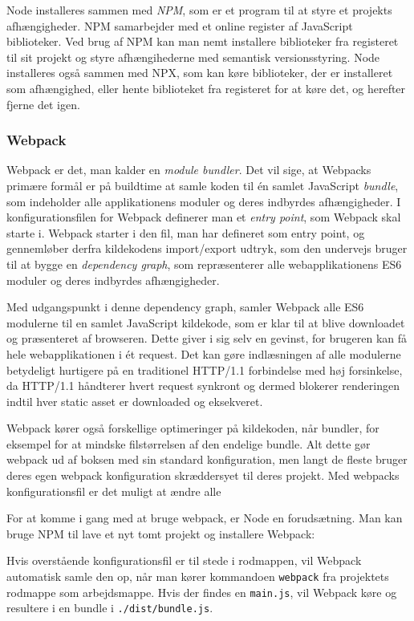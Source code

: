 \documentclass[]{article}
\begin{document}
Node installeres sammen med \emph{NPM}, som er et program til at styre
et projekts afhængigheder. NPM samarbejder med et online register af
JavaScript biblioteker. Ved brug af NPM kan man nemt installere
biblioteker fra registeret til sit projekt og styre afhængihederne med
semantisk versionsstyring. Node installeres også sammen med NPX, som kan
køre biblioteker, der er installeret som afhængighed, eller hente
biblioteket fra registeret for at køre det, og herefter fjerne det igen.

\hypertarget{webpack}{%
\subsubsection{Webpack}\label{webpack}}

Webpack er det, man kalder en \emph{module bundler}. Det vil sige, at
Webpacks primære formål er på buildtime at samle koden til én samlet
JavaScript \emph{bundle}, som indeholder alle applikationens moduler og
deres indbyrdes afhængigheder. I konfigurationsfilen for Webpack
definerer man et \emph{entry point}, som Webpack skal starte i. Webpack
starter i den fil, man har defineret som entry point, og gennemløber
derfra kildekodens import/export udtryk, som den undervejs bruger til at
bygge en \emph{dependency graph}, som repræsenterer alle
webapplikationens ES6 moduler og deres indbyrdes afhængigheder.

Med udgangspunkt i denne dependency graph, samler Webpack alle ES6
modulerne til en samlet JavaScript kildekode, som er klar til at blive
downloadet og præsenteret af browseren. Dette giver i sig selv en
gevinst, for brugeren kan få hele webapplikationen i ét request. Det kan
gøre indlæsningen af alle modulerne betydeligt hurtigere på en
traditionel HTTP/1.1 forbindelse med høj forsinkelse, da HTTP/1.1
håndterer hvert request synkront og dermed blokerer renderingen indtil
hver static asset er downloaded og eksekveret.

Webpack kører også forskellige optimeringer på kildekoden, når bundler,
for eksempel for at mindske filstørrelsen af den endelige bundle. Alt
dette gør webpack ud af boksen med sin standard konfiguration, men langt
de fleste bruger deres egen webpack konfiguration skræddersyet til deres
projekt. Med webpacks konfigurationsfil er det muligt at ændre alle

For at komme i gang med at bruge webpack, er Node en forudsætning. Man
kan bruge NPM til lave et nyt tomt projekt og installere Webpack:

Hvis overstående konfigurationsfil er til stede i rodmappen, vil Webpack
automatisk samle den op, når man kører kommandoen \texttt{webpack} fra
projektets rodmappe som arbejdsmappe. Hvis der findes en
\texttt{main.js}, vil Webpack køre og resultere i en bundle i
\texttt{./dist/bundle.js}.
\end{document}
